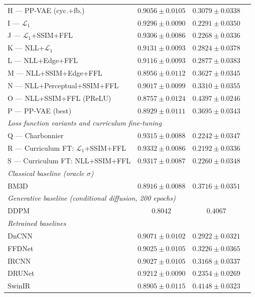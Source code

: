 \documentclass[12pt, a4paper, twoside, openright]{book}
\begin{document}
\begin{table}[htbp]
\begin{tabular}{lccc}
H --- PP-VAE (cyc.+fb.)                  & $0.9056 \pm 0.0105$          & $0.3079 \pm 0.0338$ \\
I --- $\mathcal{L}_1$                    & $0.9296 \pm 0.0090$          & $0.2291 \pm 0.0350$ \\
J --- $\mathcal{L}_1$+SSIM+FFL          & $0.9306 \pm 0.0086$          & $0.2268 \pm 0.0336$ \\
K --- NLL+$\mathcal{L}_1$               & $0.9131 \pm 0.0093$          & $0.2824 \pm 0.0378$ \\
L --- NLL+Edge+FFL                       & $0.9116 \pm 0.0093$          & $0.2877 \pm 0.0383$ \\
M --- NLL+SSIM+Edge+FFL                  & $0.8956 \pm 0.0112$          & $0.3627 \pm 0.0345$ \\
N --- NLL+Perceptual+SSIM+FFL            & $0.9017 \pm 0.0099$          & $0.3310 \pm 0.0355$ \\
O --- NLL+SSIM+FFL (PReLU)               & $0.8757 \pm 0.0124$          & $0.4397 \pm 0.0246$ \\
P --- PP-VAE (best)                      & $0.8929 \pm 0.0111$          & $0.3695 \pm 0.0343$ \\
\midrule
\multicolumn{3}{l}{\textit{Loss function variants and curriculum fine-tuning}} \\
Q --- Charbonnier                        & $0.9315 \pm 0.0088$          & $0.2242 \pm 0.0347$ \\
R --- Curriculum FT: $\mathcal{L}_1$+SSIM+FFL & $\mathbf{0.9332 \pm 0.0086}$ & $\mathbf{0.2192 \pm 0.0336}$ \\
S --- Curriculum FT: NLL+SSIM+FFL        & $0.9317 \pm 0.0087$          & $0.2260 \pm 0.0348$ \\
\midrule
\multicolumn{3}{l}{\textit{Classical baseline (oracle $\sigma$)}} \\
BM3D \cite{dabov_image_2007}             & $0.8916 \pm 0.0088$          & $0.3716 \pm 0.0351$ \\
\midrule
\multicolumn{3}{l}{\textit{Generative baseline (conditional diffusion, 200 epochs)}} \\
DDPM \cite{saharia_palette_2022}         & $0.8042$                     & $0.4067$ \\
\midrule
\multicolumn{3}{l}{\textit{Retrained baselines}} \\
DnCNN \cite{zhang_beyond_2017}          & $0.9071 \pm 0.0102$          & $0.2922 \pm 0.0321$ \\
FFDNet \cite{zhang_ffdnet_2018}         & $0.9025 \pm 0.0105$          & $0.3226 \pm 0.0365$ \\
IRCNN \cite{zhang_learning_2017}        & $0.9027 \pm 0.0105$          & $0.3168 \pm 0.0337$ \\
DRUNet \cite{zhang_plug_2021}           & $0.9212 \pm 0.0090$          & $0.2354 \pm 0.0269$ \\
SwinIR \cite{liang_swinir_2021}         & $0.8905 \pm 0.0115$          & $0.4148 \pm 0.0323$ \\
\bottomrule
\end{tabular}
\end{table}
\end{document}
